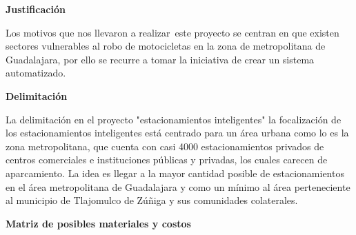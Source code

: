 \documentclass[12pt]{article}
\begin{document}
\textbf{Justificación}\par

Los motivos que nos llevaron a realizar\ este proyecto se centran en que existen sectores vulnerables al robo de motocicletas en la zona de metropolitana de Guadalajara, por ello se recurre a tomar la iniciativa de crear un sistema automatizado.  \par

\textbf{Delimitación}\par

La delimitación en el proyecto "estacionamientos inteligentes" la focalización de los estacionamientos inteligentes está centrado para un área urbana como lo es la zona metropolitana, que cuenta con casi 4000 estacionamientos privados de centros comerciales e instituciones públicas y privadas, los cuales carecen de aparcamiento. La idea es llegar a la mayor cantidad posible de estacionamientos en el área metropolitana de Guadalajara y como un mínimo al área perteneciente al municipio de Tlajomulco de Zúñiga y sus comunidades colaterales.\par


\vspace{\baselineskip}

\vspace{\baselineskip}

\vspace{\baselineskip}

\vspace{\baselineskip}
\textbf{Matriz de posibles materiales y costos}\par



\end{document}
